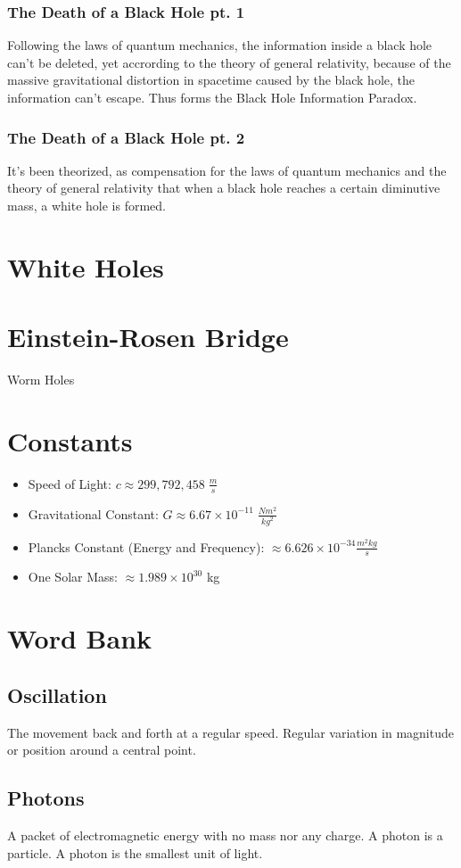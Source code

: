 \documentclass{article}
\begin{document}
\subsubsection{The Death of a Black Hole pt. 1}
Following the laws of quantum mechanics, the information inside a black hole can't be deleted, yet accrording to the theory of general relativity, because of the massive gravitational distortion in spacetime caused by the black hole, the information can't escape. Thus forms the Black Hole Information Paradox.

\subsubsection{The Death of a Black Hole pt. 2}
It's been theorized, as compensation for the laws of quantum mechanics and the theory of general relativity that when a black hole reaches a certain diminutive mass, a white hole is formed.

\section{White Holes}




\section{Einstein-Rosen Bridge}
Worm Holes



\section{Constants}\label{sec:constants}
\begin{itemize}
    \item Speed of Light: $c \approx 299,792,458\;\frac{m}{s}$
    \item Gravitational Constant: $G \approx 6.67 \times 10^{-11}\;\frac{Nm^2}{kg^2}$
    \item Plancks Constant (Energy and Frequency): $\approx 6.626\times 10^{-34}\frac{m^2kg}{s}$
    \item One Solar Mass: $\approx 1.989 \times 10^{30}$ kg
\end{itemize}

\section{Word Bank}
\subsection{Oscillation}\label{sec:oscillation}
The movement back and forth at a regular speed. Regular variation in magnitude or position around a central point.

\subsection{Photons}\label{sec:photons}
A packet of electromagnetic energy with no mass nor any charge. A photon is a particle. A photon is the smallest unit of light.
\end{document}
